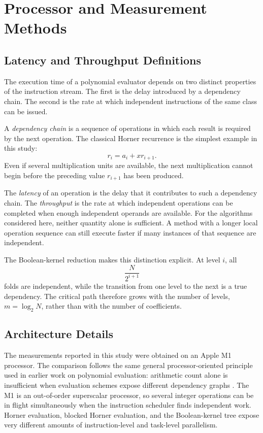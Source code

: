 \section{Processor and Measurement Methods}
\label{sec:methods}

\subsection{Latency and Throughput Definitions}
\label{sec:latency-throughput}

The execution time of a polynomial evaluator depends on two distinct
properties of the instruction stream.  The first is the delay introduced by
a dependency chain.  The second is the rate at which independent
instructions of the same class can be issued.

A \emph{dependency chain} is a sequence of operations in which each result
is required by the next operation.  The classical Horner recurrence is the
simplest example in this study:
\[
r_i=a_i+xr_{i+1}.
\]
Even if several multiplication units are available, the next multiplication
cannot begin before the preceding value \(r_{i+1}\) has been produced.

The \emph{latency} of an operation is the delay that it contributes to such
a dependency chain.  The \emph{throughput} is the rate at which independent
operations can be completed when enough independent operands are available.
For the algorithms considered here, neither quantity alone is sufficient.
A method with a longer local operation sequence can still execute faster if
many instances of that sequence are independent.

The Boolean-kernel reduction makes this distinction explicit.  At level
\(i\), all
\[
\frac{N}{2^{i+1}}
\]
folds are independent, while the transition from one level to the next is a
true dependency.  The critical path therefore grows with the number of
levels, \(m=\log_2 N\), rather than with the number of coefficients.

\subsection{Architecture Details}
\label{sec:architecture}

The measurements reported in this study were obtained on an Apple M1
processor.  The comparison follows the same general processor-oriented
principle used in earlier work on polynomial evaluation: arithmetic count
alone is insufficient when evaluation schemes expose different dependency
graphs \cite{ewart2020}.  The M1 is an out-of-order superscalar processor,
so several integer operations can be in flight simultaneously when the
instruction scheduler finds independent work.  Horner evaluation, blocked
Horner evaluation, and the Boolean-kernel tree expose very different
amounts of instruction-level and task-level parallelism.

